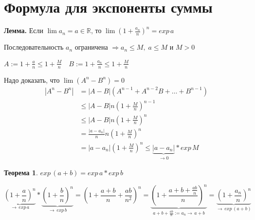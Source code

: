 \documentclass[12pt,letterpaper]{report}
\makeatletter
\newtheorem*{theorem-non}{Теорема}
\theoremstyle{definition}
\renewenvironment{proof}[1][\proofname]{%
   \par\pushQED{\qed}\normalfont%
   \topsep6\p@\@plus6\p@\relax
   \trivlist\item[\hskip\labelsep\bfseries#1\@addpunct{.}]%
   \ignorespaces
}{%
   \popQED\endtrivlist\@endpefalse
}
\makeatother
\begin{document}
    \section{Формула для экспоненты суммы}
    \textbf{Лемма.}
        Если $\lim a_n = a \in \mathbb{R}$, то $\lim (1 + \frac{a_n}{n})^n = exp\,a$    
    \begin{proof}
        Последовательность $a_n$ ограничена $\Rightarrow a_n \leqslant M,\; a \leqslant M$ и $M > 0$
        
        $A := 1 + \frac{a}{n} \leqslant 1 + \frac{M}{n} \quad B:= 1 + \frac{a_n}{n} \leqslant 1 + \frac{M}{n}$
        
        Надо доказать, что $\lim(A^n - B^n) = 0$
        \begin{equation*}
            \begin{split}
                |A^n - B^n| &= |A - B|(A^{n-1} + A^{n-2}B + \dots + B^{n-1}) \\ &\leqslant |A-B|n(1 + \frac{M}{n})^{n-1} \\
                &\leqslant |A-B|n(1 + \frac{M}{n})^n \\ 
                &= \frac{|a-a_n|}{n}n(1 + \frac{M}{n})^n \\
                &= |a - a_n|(1 + \frac{M}{n})^n \leqslant \underbrace{|a-a_n|}_{\to 0}*exp\,M
            \end{split}
        \end{equation*}
    \end{proof}
    \begin{theorem-non}
        $exp\,(a+b) = exp\,a * exp\,b$
    \end{theorem-non}
    \begin{proof}
        \[ \underbrace{(1 + \frac{a}{n})^n}_{\to\,exp\,a} * \underbrace{(1 + \frac{b}{n})^n}_{\to\,exp\,b} = (1 + \frac{a+b}{n} + \frac{ab}{n^2})^n = \underbrace{(1 + \frac{a + b + \frac{ab}{n}}{n})^n}_{a + b + \frac{ab}{n} := a_n \to\,a + b} = \underbrace{(1 + \frac{a_n}{n})^n}_{\to\,exp\,(a+b)} \]
    \end{proof}
    
\end{document}
